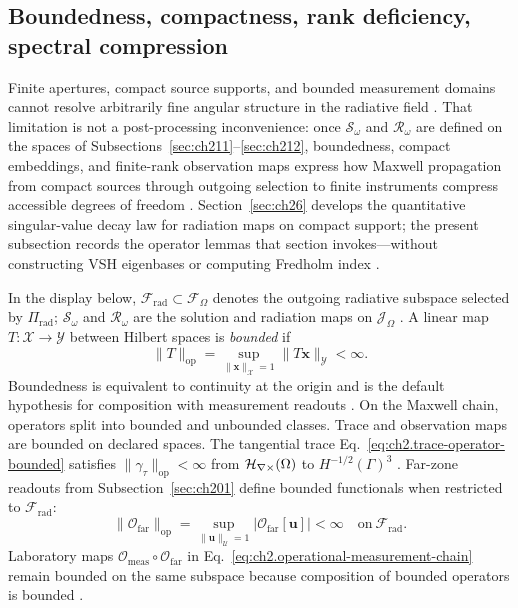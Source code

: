 \subsection{Boundedness, compactness, rank deficiency, spectral compression}
\label{sec:ch213}

Finite apertures, compact source supports, and bounded measurement domains cannot resolve arbitrarily fine angular structure in the radiative field \cite{hansen1988,jackson1999}. That limitation is not a post-processing inconvenience: once \(\mathcal{S}_\omega\) and \(\mathcal{R}_\omega\) are defined on the spaces of Subsections~\ref{sec:ch211}--\ref{sec:ch212}, boundedness, compact embeddings, and finite-rank observation maps express how Maxwell propagation from compact sources through outgoing selection to finite instruments compress accessible degrees of freedom \cite{maxwell1873,stratton1941}. Section~\ref{sec:ch26} develops the quantitative singular-value decay law for radiation maps on compact support; the present subsection records the operator lemmas that section invokes---without constructing VSH eigenbases or computing Fredholm index \cite{stratton1941}.

In the display below, \(\mathcal{F}_{\mathrm{rad}}\subset\mathcal{F}_\Omega\) denotes the outgoing radiative subspace selected by \(\Pi_{\mathrm{rad}}\); \(\mathcal{S}_\omega\) and \(\mathcal{R}_\omega\) are the solution and radiation maps on \(\mathcal{J}_\Omega\) \cite{harrington2001}. A linear map \(T:\mathcal{X}\to\mathcal{Y}\) between Hilbert spaces is \emph{bounded} if
\begin{equation}
\label{eq:ch2.operator-boundedness}
\|T\|_{\mathrm{op}}
=
\sup_{\|\mathbf{x}\|_{\mathcal{X}}=1}\|T\mathbf{x}\|_{\mathcal{Y}}
<\infty.
\end{equation}
Boundedness is equivalent to continuity at the origin and is the default hypothesis for composition with measurement readouts \cite{stratton1941}. On the Maxwell chain, operators split into bounded and unbounded classes. Trace and observation maps are bounded on declared spaces. The tangential trace Eq.~\eqref{eq:ch2.trace-operator-bounded} satisfies \(\|\gamma_\tau\|_{\mathrm{op}}<\infty\) from \(\mathcal{H}_{\nabla\times}(\Omega)\) to \(H^{-1/2}(\Gamma)^{3}\) \cite{stratton1941}. Far-zone readouts from Subsection~\ref{sec:ch201} define bounded functionals when restricted to \(\mathcal{F}_{\mathrm{rad}}\):
\begin{equation}
\label{eq:ch2.far-observation-bounded}
\|\mathcal{O}_{\mathrm{far}}\|_{\mathrm{op}}
=
\sup_{\|\mathbf{u}\|_{\mathcal{U}}=1}
\big|\mathcal{O}_{\mathrm{far}}[\mathbf{u}]\big|
<\infty
\quad\text{on}\ \mathcal{F}_{\mathrm{rad}}.
\end{equation}
Laboratory maps \(\mathcal{O}_{\mathrm{meas}}\circ\mathcal{O}_{\mathrm{far}}\) in Eq.~\eqref{eq:ch2.operational-measurement-chain} remain bounded on the same subspace because composition of bounded operators is bounded \cite{harrington2001}.

